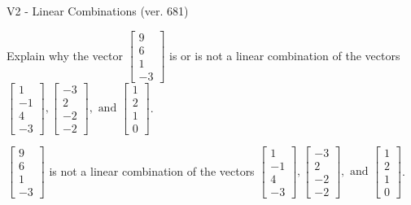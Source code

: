 \begin{exercise}
  \begin{exerciseTitle}V2 - Linear Combinations (ver. 681)\end{exerciseTitle}
  \begin{exerciseStatement}
    Explain why the vector \(\left[\begin{array}{c}
9 \\
6 \\
1 \\
-3
\end{array}\right]\)  is or is not a linear 
	combination of the vectors \(\left[\begin{array}{c}
1 \\
-1 \\
4 \\
-3
\end{array}\right] , \left[\begin{array}{c}
-3 \\
2 \\
-2 \\
-2
\end{array}\right] , \text{ and } \left[\begin{array}{c}
1 \\
2 \\
1 \\
0
\end{array}\right]\).
	


  \end{exerciseStatement}
  \begin{exerciseAnswer}
   \(\left[\begin{array}{c}
9 \\
6 \\
1 \\
-3
\end{array}\right]\) 
  	 is not  
	a linear combination of the vectors \(\left[\begin{array}{c}
1 \\
-1 \\
4 \\
-3
\end{array}\right] , \left[\begin{array}{c}
-3 \\
2 \\
-2 \\
-2
\end{array}\right] , \text{ and } \left[\begin{array}{c}
1 \\
2 \\
1 \\
0
\end{array}\right]\).

	
  


  \end{exerciseAnswer}
\end{exercise}